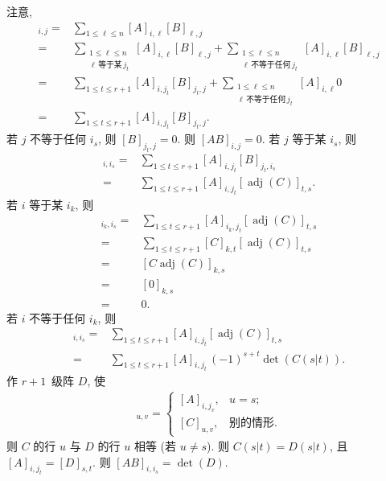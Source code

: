 \documentclass[../libro.tex]{subfiles}
\begin{document}
\begin{example}
    注意,
    \begin{align*}
        [A B]_{i,j}
        = {} &
        \sum_{1 \leq \ell \leq n} {[A]_{i,\ell} [B]_{\ell,j}}
        \\
        = {} &
        \sum_{\substack{1 \leq \ell \leq n \\ \ell\,\text{等于某}\,j_t}}
        {[A]_{i,\ell} [B]_{\ell,j}}
        + \sum_{\substack{1 \leq \ell \leq n \\ \ell\,\text{不等于任何}\,j_t}}
        {[A]_{i,\ell} [B]_{\ell,j}}
        \\
        = {} &
        \sum_{1 \leq t \leq r+1}
        {[A]_{i,j_t} [B]_{j_t,j}}
        + \sum_{\substack{1 \leq \ell \leq n \\ \ell\,\text{不等于任何}\,j_t}}
        {[A]_{i,\ell} 0}
        \\
        = {} &
        \sum_{1 \leq t \leq r+1}
        {[A]_{i,j_t} [B]_{j_t,j}}.
    \end{align*}
    若 \(j\) 不等于任何 \(i_s\), 则 \([B]_{j_t,j} = 0\).
    则 \([A B]_{i,j} = 0\).
    若 \(j\) 等于某 \(i_s\), 则
    \begin{align*}
        [A B]_{i,i_s}
        = {} &
        \sum_{1 \leq t \leq r+1} {[A]_{i,j_t} [B]_{j_t,i_s}}
        \\
        = {} &
        \sum_{1 \leq t \leq r+1}
        {[A]_{i,j_t} [\operatorname{adj} {(C)}]_{t,s}}.
    \end{align*}
    若 \(i\) 等于某 \(i_k\), 则
    \begin{align*}
        [A B]_{i_k,i_s}
        = {} &
        \sum_{1 \leq t \leq r+1}
        {[A]_{i_k,j_t} [\operatorname{adj} {(C)}]_{t,s}}
        \\
        = {} &
        \sum_{1 \leq t \leq r+1}
        {[C]_{k,t} [\operatorname{adj} {(C)}]_{t,s}}
        \\
        = {} &
        [C \operatorname{adj} {(C)}]_{k,s}
        \\
        = {} &
        [0]_{k,s}
        \\
        = {} &
        0.
    \end{align*}
    若 \(i\) 不等于任何 \(i_k\), 则
    \begin{align*}
        [A B]_{i,i_s}
        = {} &
        \sum_{1 \leq t \leq r+1}
        {[A]_{i,j_t} [\operatorname{adj} {(C)}]_{t,s}}
        \\
        = {} &
        \sum_{1 \leq t \leq r+1}
        {[A]_{i,j_t}\, (-1)^{s+t} \det {(C(s|t))}}.
    \end{align*}
    作 \(r+1\)~级阵 \(D\), 使
    \begin{align*}
        [D]_{u,v} =
        \begin{cases}
            [A]_{i,j_v}, & u = s;       \\
            [C]_{u,v},   & \text{别的情形}.
        \end{cases}
    \end{align*}
    则 \(C\) 的行 \(u\) 与 \(D\) 的行 \(u\) 相等
    (若 \(u \neq s\)).
    则 \(C(s|t) = D(s|t)\),
    且 \([A]_{i,j_t} = [D]_{s,t}\).
    则 \([A B]_{i,i_s} = \det {(D)}\).


\end{example}
\end{document}
